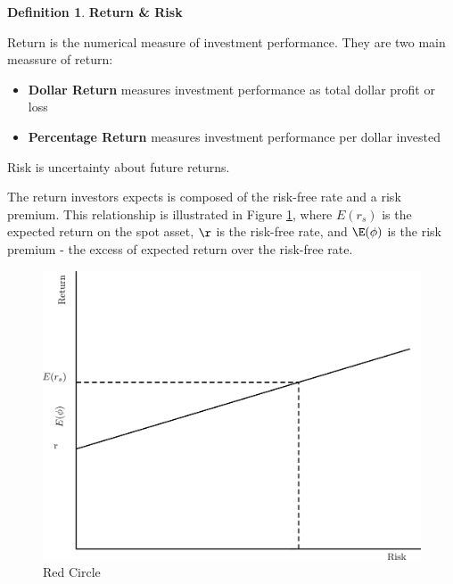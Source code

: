 \documentclass{book}
\theoremstyle{definition}
\newtheorem{definition}{Definition}[section]
\theoremstyle{remark}
\begin{document}
    \begin{definition}{\textbf{Return \& Risk}}
    
        Return is the numerical measure of investment performance. They are two main meassure of return:
            \begin{itemize}
                \item \textbf{Dollar Return} measures investment performance as total dollar profit or loss
                
                \item \textbf{Percentage Return} measures investment performance per dollar invested
            \end{itemize}
        
        Risk is uncertainty about future returns.
        
        The return investors expects is composed of the risk-free rate and a risk premium. This relationship is illustrated in Figure \ref{1.RiskReturn}, where $E(r_s)$ is the expected return on the spot asset, $\r$ is the risk-free rate, and $\E(\phi)$ is the risk premium - the excess of expected return over the risk-free rate.
            \begin{figure}
                \centering
                \label{1.RiskReturn}
                    \includegraphics[scale=0.125]{images/Test.png}
                \caption{Red Circle}
            \end{figure}
        
        
    \end{definition}
    
\end{document}
